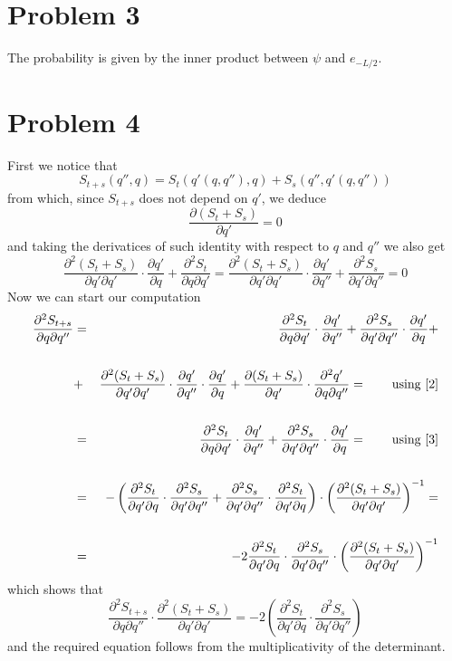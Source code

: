 \documentclass[]{article}
\newcommand{\D}[2]{\frac{\partial #1}{\partial #2}}
\newcommand{\DD}[3]{\frac{\partial^2 #1}{\partial #2 \partial #3}}
\begin{document}
\section{Problem 3}

The probability is given by the inner product between $\psi$ and $e_{-L/2}$.



\section{Problem 4}
First we notice that 
\begin{equation}\label{1}
	S_{t+s}(q'',q) = S_{t}(q'(q,q''),q) + S_{s}(q'', q'(q,q''))
\end{equation}
from which, since $S_{t+s}$ does not depend on $q'$, we deduce
\begin{equation}\label{2}
	\D{(S_{t}+S_{s})}{q'} = 0
\end{equation}
and taking the derivatices of such identity with respect to $q$ and $q''$ we also get
\begin{equation}\label{3}
	\DD{(S_{t}+S_{s})}{q'}{q'}\cdot\D{q'}{q} + \DD{S_t}{q}{q'} = \DD{(S_{t}+S_{s})}{q'}{q'}\cdot\D{q'}{q''} + \DD{S_s}{q'}{q''} = 0
\end{equation}
Now we can start our computation
\begin{eqnarray*}
	\DD{S_{t+s}}{q}{q''} &=& \DD{S_{t}}{q}{q'}\cdot\D{q'}{q''} + \DD{S_{s}}{q'}{q''}\cdot\D{q'}{q} + \\\\ 
	&+& \DD{(S_t+S_s)}{q'}{q'}\cdot\D{q'}{q''}\cdot\D{q'}{q} + \D{(S_t+S_s)}{q'}\cdot\DD{q'}{q}{q''} = \qquad \text{using \eqref{2}} \\\\
	&=& \DD{S_{t}}{q}{q'}\cdot\D{q'}{q''} + \DD{S_{s}}{q'}{q''}\cdot\D{q'}{q} = \qquad \text{using \eqref{3}} \\\\
	&=& -\left(\DD{S_t}{q'}{q}\cdot\DD{S_s}{q'}{q''} + \DD{S_s}{q'}{q''}\cdot\DD{S_t}{q'}{q}\right) \cdot \left( \DD{(S_{t}+S_{s})}{q'}{q'} \right)^{-1} = \\\\
	&=& -2 \DD{S_t}{q'}{q}\cdot\DD{S_s}{q'}{q''} \cdot \left( \DD{(S_{t}+S_{s})}{q'}{q'} \right)^{-1}
\end{eqnarray*}
which shows that 
$$ \DD{S_{t+s}}{q}{q''}\cdot\DD{(S_{t}+S_{s})}{q'}{q'} = -2\left(\DD{S_t}{q'}{q}\cdot\DD{S_s}{q'}{q''}\right) $$
and the required equation follows from the multiplicativity of the determinant.
\end{document}
